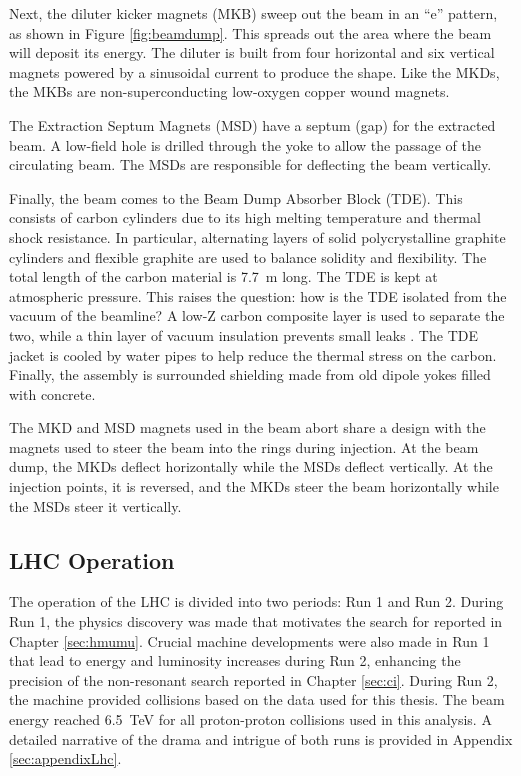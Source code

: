 Next, the diluter kicker magnets (MKB) sweep out the beam in an ``e'' pattern, as shown in Figure \ref{fig:beamdump}.
This spreads out the area where the beam will deposit its energy.
The diluter is built from four horizontal and six vertical magnets powered by a sinusoidal current to produce the shape.
Like the MKDs, the MKBs are non-superconducting low-oxygen copper wound magnets.

The Extraction Septum Magnets (MSD) have a septum (gap) for the extracted beam.
A low-field hole is drilled through the yoke to allow the passage of the circulating beam.
The MSDs are responsible for deflecting the beam vertically.

Finally, the beam comes to the Beam Dump Absorber Block (TDE).
This consists of carbon cylinders due to its high melting temperature and thermal shock resistance.
In particular, alternating layers of solid polycrystalline graphite cylinders and flexible graphite are used to balance solidity and flexibility.
The total length of the carbon material is 7.7~m long.
The TDE is kept at atmospheric pressure. This raises the question: how is the TDE isolated from the vacuum of the beamline? A low-Z carbon composite layer is used to separate the two, while a thin layer of vacuum insulation prevents small leaks \cite{beamdump}.
The TDE jacket is cooled by water pipes to help reduce the thermal stress on the carbon.
Finally, the assembly is surrounded shielding made from old dipole yokes filled with concrete.

The MKD and MSD magnets used in the beam abort share a design with the magnets used to steer the beam into the rings during injection.
At the beam dump, the MKDs deflect horizontally while the MSDs deflect vertically.
At the injection points, it is reversed, and the MKDs steer the beam horizontally while the MSDs steer it vertically.

\subsection{LHC Operation}

The operation of the LHC is divided into two periods: Run 1 and Run 2.
During Run 1, the physics discovery was made that motivates the search for \vhmm reported in Chapter \ref{sec:hmumu}.
Crucial machine developments were also made in Run 1 that lead to energy and luminosity increases during Run 2, enhancing the precision of the non-resonant search reported in Chapter \ref{sec:ci}.
During Run 2, the machine provided collisions based on the data used for this thesis.
The beam energy reached 6.5~TeV for all proton-proton collisions used in this analysis.
A detailed narrative of the drama and intrigue of both runs is provided in Appendix \ref{sec:appendixLhc}.

